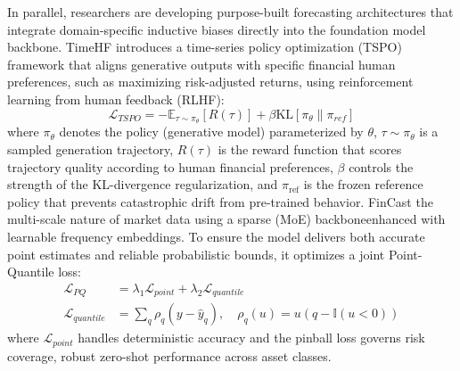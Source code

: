 In parallel, researchers are developing purpose-built forecasting architectures that integrate domain-specific inductive biases directly into the foundation model backbone. TimeHF \citep{qi2025timehf} introduces a time-series policy optimization (TSPO) framework that aligns generative outputs with specific financial human preferences, such as maximizing risk-adjusted returns, using reinforcement learning from human feedback (RLHF):
\begin{equation}
\mathcal{L}_{TSPO} = -\mathbb{E}_{\tau \sim \pi_\theta}[R(\tau)] + \beta \text{KL}[\pi_\theta \| \pi_{ref}]
\end{equation}
where $\pi_\theta$ denotes the policy (generative model) parameterized by $\theta$, $\tau \sim \pi_\theta$ is a sampled generation trajectory, $R(\tau)$ is the reward function that scores trajectory quality according to human financial preferences, $\beta$ controls the strength of the KL-divergence regularization, and $\pi_{\text{ref}}$ is the frozen reference policy that prevents catastrophic drift from pre-trained behavior.
FinCast \citep{zhu2025fincast} the multi-scale nature of market data using a sparse (MoE) backboneenhanced with learnable frequency embeddings. To ensure the model delivers both accurate point estimates and reliable probabilistic bounds, it optimizes a joint Point-Quantile loss:
\begin{align}
\mathcal{L}_{PQ} &= \lambda_1 \mathcal{L}_{point} + \lambda_2 \mathcal{L}_{quantile} \\
\mathcal{L}_{quantile} &= \sum_q \rho_q(y - \hat{y}_q), \quad \rho_q(u) = u(q - \mathbb{I}(u < 0))
\end{align}
where $\mathcal{L}_{point}$ handles deterministic accuracy and the pinball loss governs risk coverage, robust zero-shot performance across asset classes.


